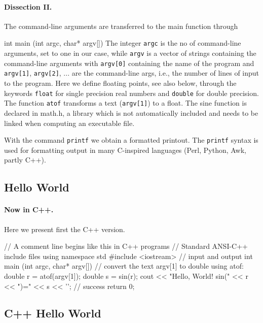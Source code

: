 \documentclass[%
oneside,                 %
final,                   %
10pt]{article}
\begin{document}
{%
\paragraph{Dissection II.}
The command-line arguments are transferred to the main function through

\bcppcod
   int main (int argc, char* argv[])
\ecppcod
The integer \Verb!argc! is the no of command-line arguments, set to
one in our case, while
\Verb!argv! is a vector of strings containing the command-line arguments
with \Verb!argv[0]! containing  the name of the program
and \Verb!argv[1]!, \Verb!argv[2]!, ... are the command-line args, i.e., the number of
lines of input to the program.
Here we define floating points, see also below,
through the keywords \Verb!float! for single precision real numbers and
\Verb!double! for double precision. The function
\Verb!atof! transforms a text (\Verb!argv[1]!) to a float.
The sine function is declared in math.h, a library which
is not automatically included and needs to be linked when computing
an executable file.

With the command \Verb!printf! we obtain a formatted printout.
The \Verb!printf! syntax is used for formatting output
in many C-inspired languages (Perl, Python, Awk, partly C++).



\subsection{Hello World}


\paragraph{Now in C++.}
Here we present first the C++ version.

\bcpppro
// A comment line begins like this in C++ programs
// Standard ANSI-C++ include files
using namespace std
#include <iostream>  // input and output
int main (int argc, char* argv[])
{
  // convert the text argv[1] to double using atof:
  double r = atof(argv[1]);
  double s = sin(r);
  cout << "Hello, World! sin(" << r << ")=" << s << '\n';
  // success
  return 0;
}
\ecpppro



\subsection{C++ Hello World}


}
\end{document}

